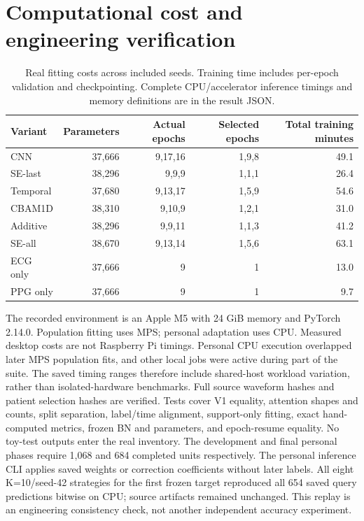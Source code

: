 \documentclass[11pt]{article}
\begin{document}
\section{Computational cost and engineering verification}
\begin{table}[t]\centering\small
\begin{tabular}{lrrrr}\toprule
Variant & Parameters & Actual epochs & Selected epochs & Total training minutes\\\midrule
CNN & 37,666 & 9,17,16 & 1,9,8 & 49.1\\
SE-last & 38,296 & 9,9,9 & 1,1,1 & 26.4\\
Temporal & 37,680 & 9,13,17 & 1,5,9 & 54.6\\
CBAM1D & 38,310 & 9,10,9 & 1,2,1 & 31.0\\
Additive & 38,296 & 9,9,11 & 1,1,3 & 41.2\\
SE-all & 38,670 & 9,13,14 & 1,5,6 & 63.1\\
ECG only & 37,666 & 9 & 1 & 13.0\\
PPG only & 37,666 & 9 & 1 & 9.7\\
\bottomrule\end{tabular}
\caption{Real fitting costs across included seeds. Training time includes per-epoch validation and checkpointing. Complete CPU/accelerator inference timings and memory definitions are in the result JSON.}\end{table}
The recorded environment is an Apple M5 with 24 GiB memory and PyTorch 2.14.0.
Population fitting uses MPS; personal adaptation uses CPU. Measured desktop
costs are not Raspberry Pi timings. Personal CPU execution overlapped later
MPS population fits, and other local jobs were active during part of the suite.
The saved timing ranges therefore include shared-host workload variation,
rather than isolated-hardware benchmarks.
Full source waveform hashes and patient
selection hashes are verified. Tests cover V1 equality, attention shapes and
counts, split separation, label/time alignment, support-only fitting, exact
hand-computed metrics, frozen BN and parameters, and epoch-resume equality.
No toy-test outputs enter the real inventory. The development and final
personal phases require 1,068 and 684 completed units respectively.
The personal inference CLI applies saved weights or correction coefficients
without later labels. All eight K=10/seed-42 strategies for the first frozen
target reproduced all 654 saved query predictions bitwise on CPU; source
artifacts remained unchanged. This replay is an engineering consistency
check, not another independent accuracy experiment.
\end{document}
